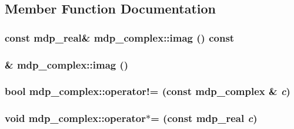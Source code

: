\subsection{Member Function Documentation}
\hypertarget{classmdp__complex_a968b27741c048c98cf48e22936258904}{
\subsubsection[{imag}]{\setlength{\rightskip}{0pt plus 5cm}const {\bf mdp\_\-real}\& mdp\_\-complex::imag () const}}
\label{classmdp__complex_a968b27741c048c98cf48e22936258904}
\hypertarget{classmdp__complex_a6426bc039248f24201db0e4344bf2409}{
\subsubsection[{imag}]{\& mdp\_\-complex::imag ()}}
\label{classmdp__complex_a6426bc039248f24201db0e4344bf2409}
\hypertarget{classmdp__complex_ae2e655d313ce4433ca59dcfb59b94cff}{
\subsubsection[{operator!=}]{\setlength{\rightskip}{0pt plus 5cm}bool mdp\_\-complex::operator!= (const {\bf mdp\_\-complex} \& {\em c})}}
\label{classmdp__complex_ae2e655d313ce4433ca59dcfb59b94cff}
\hypertarget{classmdp__complex_af073e0a4d5e1dd7495797b42312d35cb}{
\subsubsection[{operator$\ast$=}]{\setlength{\rightskip}{0pt plus 5cm}void mdp\_\-complex::operator$\ast$= (const {\bf mdp\_\-real} {\em c})}}
